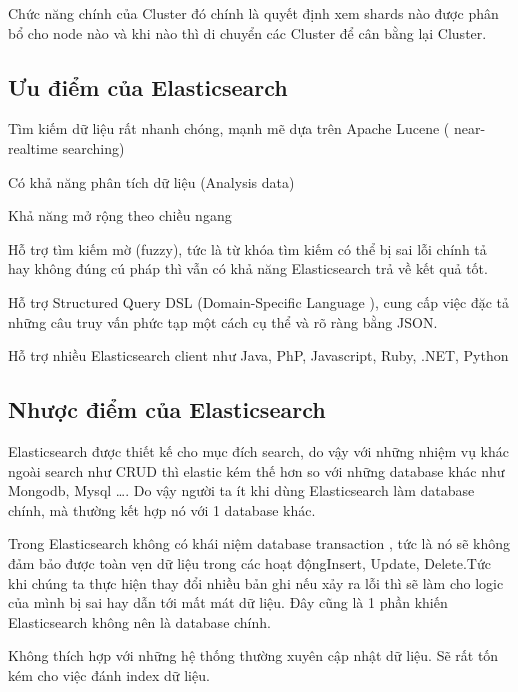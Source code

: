 Chức năng chính của Cluster đó chính là quyết định xem shards nào được phân bổ cho node nào và khi nào thì di chuyển các Cluster để cân bằng lại Cluster.

\subsection{Ưu điểm của Elasticsearch}
Tìm kiếm dữ liệu rất nhanh chóng, mạnh mẽ dựa trên Apache Lucene ( near-realtime searching)

Có khả năng phân tích dữ liệu (Analysis data)

Khả năng mở rộng theo chiều ngang

Hỗ trợ tìm kiếm mờ (fuzzy), tức là từ khóa tìm kiếm có thể bị sai lỗi chính tả hay không đúng cú pháp thì vẫn có khả năng Elasticsearch trả về kết quả tốt.

Hỗ trợ Structured Query DSL (Domain-Specific Language ), cung cấp việc đặc tả những câu truy vấn phức tạp một cách cụ thể và rõ ràng bằng JSON.

Hỗ trợ nhiều Elasticsearch client như Java, PhP, Javascript, Ruby, .NET, Python

\subsection{Nhược điểm của Elasticsearch}

Elasticsearch được thiết kế cho mục đích search, do vậy với những nhiệm vụ khác ngoài search như CRUD thì elastic kém thế hơn so với những database khác như Mongodb, Mysql …. Do vậy người ta ít khi dùng Elasticsearch làm database chính, mà thường kết hợp nó với 1 database khác.

Trong Elasticsearch không có khái niệm database transaction , tức là nó sẽ không đảm bảo được toàn vẹn dữ liệu trong các hoạt độngInsert, Update, Delete.Tức khi chúng ta thực hiện thay đổi nhiều bản ghi nếu xảy ra lỗi thì sẽ làm cho logic của mình bị sai hay dẫn tới mất mát dữ liệu. Đây cũng là 1 phần khiến Elasticsearch không nên là database chính.

Không thích hợp với những hệ thống thường xuyên cập nhật dữ liệu. Sẽ rất tốn kém cho việc đánh index dữ liệu.	

